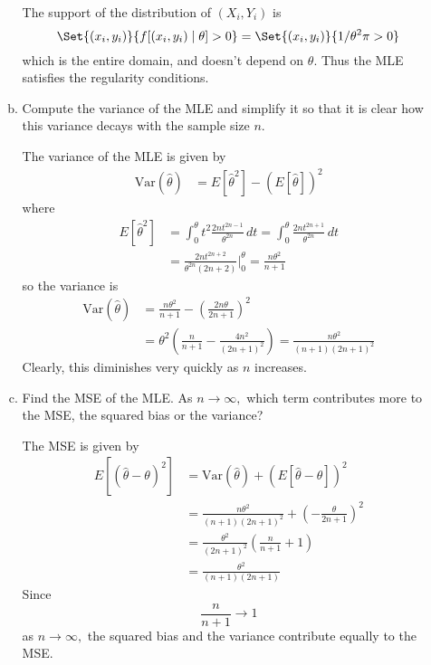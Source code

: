 \documentclass{article}
\newcommand{\var}{\mathrm{Var}}
\begin{document}
\begin{enumerate}
\begin{enumerate}[(a)]
\begin{soln}
					The support of the distribution of $(X_i, Y_i)$ is \[\Set{(x_i, y_i)}{f[(x_i, y_i)\mid\theta]>0}=\Set{(x_i, y_i)}{1/\theta^2\pi>0}\] which is the entire domain, and doesn't depend on $\theta.$ Thus the MLE satisfies the regularity conditions.
					
				\end{soln}

			\item Compute the variance of the MLE and simplify it so that it is clear how this variance decays with the sample size $n.$
				\begin{soln}
					The variance of the MLE is given by 
					\begin{align*}
						\var(\hat{\theta}) &= E[\hat{\theta}^2]-(E[\hat{\theta}])^2 
					\end{align*} where 
					\begin{align*}
						E[\hat{\theta}^2] &= \int_0^\theta t^2 \frac{2nt^{2n-1}}{\theta^{2n}}\, dt = \int_0^\theta \frac{2nt^{2n+1}}{\theta^{2n}}\, dt \\
						&= \frac{2nt^{2n+2}}{\theta^{2n}(2n+2)}\bigg\vert_0^\theta = \frac{n\theta^2}{n+1}
					\end{align*} so the variance is 
					\begin{align*}
					\var(\hat{\theta}) &= \frac{n\theta^2}{n+1}-\left( \frac{2n\theta}{2n+1} \right)^2 \\ 
					&= \theta^2\left( \frac{n}{n+1}-\frac{4n^2}{(2n+1)^2} \right) = \frac{n\theta^2}{(n+1)(2n+1)^2}
					\end{align*} Clearly, this diminishes very quickly as $n$ increases.
					
				\end{soln}

			\item Find the MSE of the MLE. As $n\to\infty,$ which term contributes more to the MSE, the squared bias or the variance?
				\begin{soln}
					The MSE is given by 
					\begin{align*}
						E[(\hat{\theta}-\theta)^2] &= \var(\hat{\theta}) + \left( E[\hat{\theta}-\theta] \right)^2 \\
						&= \frac{n\theta^2}{(n+1)(2n+1)^2} + \left( -\frac{\theta}{2n+1} \right)^2 \\
						&\tag{1}=\frac{\theta^2}{(2n+1)^2}\left( \frac{n}{n+1}+1 \right) \\ 
						&= \frac{\theta^2}{(n+1)(2n+1)}
					\end{align*}
					Since \[\frac{n}{n+1}\to1\] as $n\to\infty,$ the squared bias and the variance contribute equally to the MSE.
					

\end{soln}
\end{enumerate}
\end{enumerate}
\end{document}
